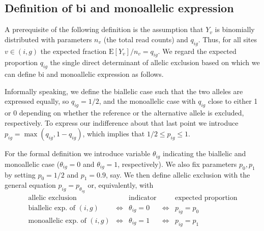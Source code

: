 \documentclass[letterpaper]{article}
\begin{document}
\subsection{Definition of bi and monoallelic expression}

A prerequisite of the following definition is the assumption that \(Y_v\) is
binomially distributed with parameters \(n_v\) (the total read counts) and
\(q_{ig}\).  Thus, for all sites \(v\in(i,g)\) the expected fraction
\(\mathrm{E}[Y_v]/n_v = q_{ig}\).
We regard the expected proportion \(q_{ig}\) the single direct determinant of
allelic exclusion based on which we can define bi and monoallelic expression
as follows.

Informally speaking, we define the biallelic case such that the two alleles
are expressed equally, so \(q_{ig}=1/2\), and the monoallelic case with
\(q_{ig}\) close to either 1 or 0 depending on whether the reference or the
alternative allele is excluded, respectively.  To express our indifference
about that last point we introduce \(p_{ig} = \max(q_{ig},
1-q_{ig}) \), which implies that \(1/2\le p_{ig}\le 1\).

For the formal definition we introduce variable \(\theta_{ig}\)
indicating the biallelic and monoallelic case (\(\theta_{ig}=0\) and \(\theta_{ig}=1\),
respectively).  We also fix parameters \(p_0,p_1\) by setting \(p_0=1/2\) and
\(p_1=0.9\), say.  We then define
allelic exclusion with the general equation \(p_{ig} = p_{\theta_{ig}}\) or,
equivalently, with
\begin{equation}
\begin{array}{rcccc}
\label{eq:hypotheses}
\text{allelic exclusion} & & \text{indicator} & & \text{expected
proportion} \\
\hline
\text{biallelic exp.~of } (i,g) & \Leftrightarrow & \theta_{ig}=0 &
\Leftrightarrow & p_{ig}=p_0 \\
\text{monoallelic exp.~of } (i,g) & \Leftrightarrow & \theta_{ig}=1 &
\Leftrightarrow & p_{ig}=p_1
\end{array}
\end{equation}
\end{document}
